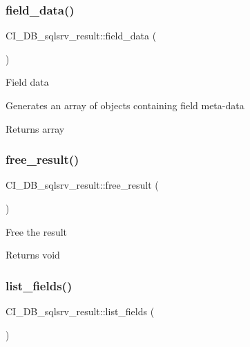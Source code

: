 \subsubsection{\texorpdfstring{field\+\_\+data()}{field\_data()}}
{\footnotesize\ttfamily C\+I\+\_\+\+D\+B\+\_\+sqlsrv\+\_\+result\+::field\+\_\+data (\begin{DoxyParamCaption}{ }\end{DoxyParamCaption})}

Field data

Generates an array of objects containing field meta-\/data

\begin{DoxyReturn}{Returns}
array 
\end{DoxyReturn}
\mbox{\label{class_c_i___d_b__sqlsrv__result_a0923acb9a50ff40c16f459565c460e66}} 
\subsubsection{\texorpdfstring{free\+\_\+result()}{free\_result()}}
{\footnotesize\ttfamily C\+I\+\_\+\+D\+B\+\_\+sqlsrv\+\_\+result\+::free\+\_\+result (\begin{DoxyParamCaption}{ }\end{DoxyParamCaption})}

Free the result

\begin{DoxyReturn}{Returns}
void 
\end{DoxyReturn}
\mbox{\label{class_c_i___d_b__sqlsrv__result_a9be7d42c62eed09cc8897b09f956d4c3}} 
\subsubsection{\texorpdfstring{list\+\_\+fields()}{list\_fields()}}
{\footnotesize\ttfamily C\+I\+\_\+\+D\+B\+\_\+sqlsrv\+\_\+result\+::list\+\_\+fields (\begin{DoxyParamCaption}{ }\end{DoxyParamCaption})}

